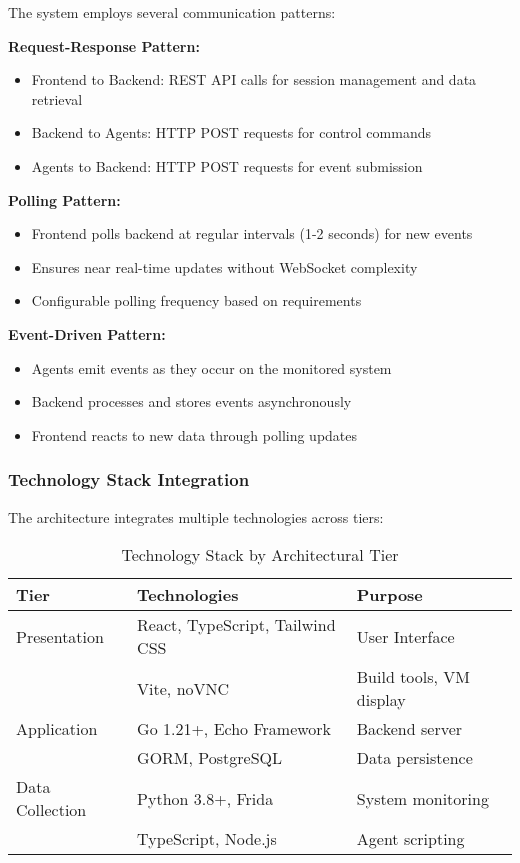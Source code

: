 The system employs several communication patterns:

\textbf{Request-Response Pattern:}
\begin{itemize}
    \item Frontend to Backend: REST API calls for session management and data retrieval
    \item Backend to Agents: HTTP POST requests for control commands
    \item Agents to Backend: HTTP POST requests for event submission
\end{itemize}

\textbf{Polling Pattern:}
\begin{itemize}
    \item Frontend polls backend at regular intervals (1-2 seconds) for new events
    \item Ensures near real-time updates without WebSocket complexity
    \item Configurable polling frequency based on requirements
\end{itemize}

\textbf{Event-Driven Pattern:}
\begin{itemize}
    \item Agents emit events as they occur on the monitored system
    \item Backend processes and stores events asynchronously
    \item Frontend reacts to new data through polling updates
\end{itemize}

\subsubsection{Technology Stack Integration}

The architecture integrates multiple technologies across tiers:

\begin{table}[h]
\centering
\begin{tabular}{|l|l|l|}
\hline
\textbf{Tier} & \textbf{Technologies} & \textbf{Purpose} \\
\hline
Presentation & React, TypeScript, Tailwind CSS & User Interface \\
 & Vite, noVNC & Build tools, VM display \\
\hline
Application & Go 1.21+, Echo Framework & Backend server \\
 & GORM, PostgreSQL & Data persistence \\
\hline
Data Collection & Python 3.8+, Frida & System monitoring \\
 & TypeScript, Node.js & Agent scripting \\
\hline
\end{tabular}
\caption{Technology Stack by Architectural Tier}
\end{table}

